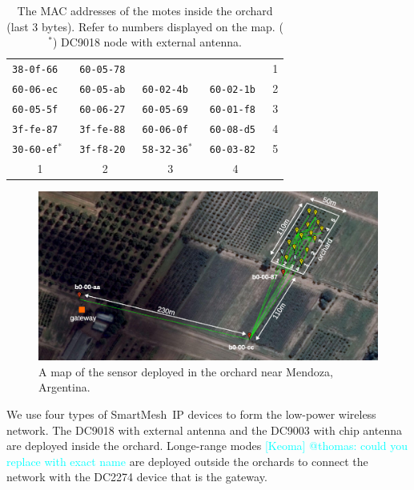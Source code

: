 \documentclass{sig-alternate}
\newcommand{\keoma}[1]              {\textcolor{cyan}{[Keoma] #1}}
\newcommand{\smip}                  {SmartMesh~IP\xspace}
\begin{document}
\begin{table}
\begin{center}
    \begin{tabular}{ | l | l | l | l | l |}
         \hline
         \tt{38-0f-66}     & \tt{60-05-78} &                   &               &  1 \\
         \tt{60-06-ec}     & \tt{60-05-ab} & \tt{60-02-4b}     & \tt{60-02-1b} &  2 \\
         \tt{60-05-5f}     & \tt{60-06-27} & \tt{60-05-69}     & \tt{60-01-f8} &  3 \\
         \tt{3f-fe-87}     & \tt{3f-fe-88} & \tt{60-06-0f}     & \tt{60-08-d5} &  4 \\
         \tt{30-60-ef}$^*$ & \tt{3f-f8-20} & \tt{58-32-36}$^*$ & \tt{60-03-82} &  5 \\
         \hline
           \multicolumn{1}{|c|}{1} & \multicolumn{1}{|c|}{2} & \multicolumn{1}{|c|}{3} & \multicolumn{1}{|c|}{4} &\\
         \hline
    \end{tabular}
    \caption{The MAC addresses of the motes inside the orchard (last 3 bytes). Refer to numbers displayed on the map. ($^*$) DC9018 node with external antenna.}
\end{center}
\end{table}

\begin{figure}
    \centering
    \includegraphics[width=\textwidth]{map_annotated}
    \caption{A map of the sensor deployed in the orchard near Mendoza, Argentina.}
    \label{fig:map}
\end{figure}


We use four types of \smip devices to form the low-power wireless network.
The DC9018 with external antenna and the DC9003 with chip antenna are deployed inside the orchard.
Longe-range modes \keoma{@thomas: could you replace with exact name} are deployed outside the orchards to connect the network with the DC2274 device that is the gateway.
\end{document}
